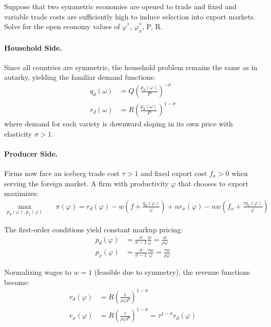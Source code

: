 Suppose that two symmetric economies are opened to trade and fixed and variable trade costs are sufficiently high to induce selection into export markets. Solve for the open economy values of $\varphi^*$, $\varphi^*_x$, P, R.

\begin{solution}
	\paragraph{Household Side.} Since all countries are symmetric, the household problem remains the same as in autarky, yielding the familiar demand functions:
	\begin{align*}
		q_d(\omega) &= Q \left( \frac{p_d(\omega)}{P} \right)^{-\sigma}\\
		r_d(\omega) &= R \left( \frac{p_d(\omega)}{P} \right)^{1 - \sigma}
	\end{align*}
	where demand for each variety is downward sloping in its own price with elasticity $\sigma>1$.

	\paragraph{Producer Side.} Firms now face an iceberg trade cost $\tau>1$ and fixed export cost $f_x>0$ when serving the foreign market. A firm with productivity $\varphi$ that chooses to export maximizes:
	\begin{align*}
		\max_{p_d(\varphi), p_x(\varphi)} \quad & \pi(\varphi) = r_d(\varphi) - w \left( f + \frac{q_d(\varphi)}{\varphi} \right) + n r_x(\varphi) - n w \left( f_x + \frac{\tau q_x(\varphi)}{\varphi} \right)
	\end{align*}

	The first-order conditions yield constant markup pricing:
	\begin{align*}
		p_d(\varphi) &= \frac{\sigma}{\sigma - 1} \frac{w}{\varphi} = \frac{w}{\rho \varphi} \\
		p_x(\varphi) &= \frac{\sigma}{\sigma - 1} \frac{\tau w}{\varphi} = \frac{\tau w}{\rho \varphi}
	\end{align*}

	Normalizing wages to $w=1$ (feasible due to symmetry), the revenue functions become:
	\begin{align*}
		r_d(\varphi) &= R \left( \frac{1}{\rho \varphi P} \right)^{1 - \sigma} \\
		r_x(\varphi) &= R \left( \frac{\tau}{\rho \varphi P} \right)^{1 - \sigma} = \tau^{1-\sigma} r_d(\varphi)
	\end{align*}


\end{solution}
